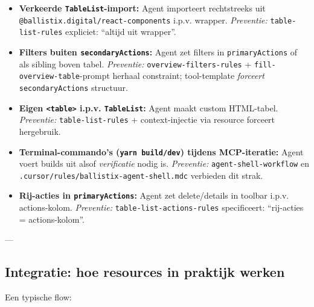 \begin{itemize}
  \item \textbf{Verkeerde \texttt{TableList}-import:} Agent importeert rechtstreeks uit \texttt{@ballistix.digital/react-components} i.p.v. wrapper.
    \newline\textit{Preventie:} \texttt{table-list-rules} expliciet: ``altijd uit wrapper''.
  
  \item \textbf{Filters buiten \texttt{secondaryActions}:} Agent zet filters in \texttt{primaryActions} of als sibling boven tabel.
    \newline\textit{Preventie:} \texttt{overview-filters-rules} + \texttt{fill-overview-table}-prompt herhaal constraint; tool-template \textit{forceert} \texttt{secondaryActions} structuur.
  
  \item \textbf{Eigen \texttt{<table>} i.p.v. \texttt{TableList}:} Agent maakt custom HTML-tabel.
    \newline\textit{Preventie:} \texttt{table-list-rules} + context-injectie via resource forceert hergebruik.
  
  \item \textbf{Terminal-commando's (\texttt{yarn build/dev}) tijdens MCP-iteratie:} Agent voert builds uit alsof \textit{verificatie} nodig is.
    \newline\textit{Preventie:} \texttt{agent-shell-workflow} en \texttt{.cursor/rules/ballistix-agent-shell.mdc} verbieden dit strak.
  
  \item \textbf{Rij-acties in \texttt{primaryActions}:} Agent zet delete/details in toolbar i.p.v. actions-kolom.
    \newline\textit{Preventie:} \texttt{table-list-actions-rules} specificeert: ``rij-acties = actions-kolom''.
\end{itemize}

---

\subsection{Integratie: hoe resources in praktijk werken}

Een typische flow:


